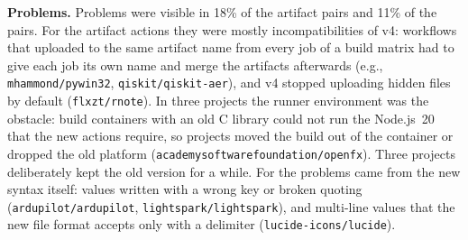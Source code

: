 \textbf{Problems.}
Problems were visible in 18\% of the artifact pairs and 11\% of the \so{} pairs.
For the artifact actions they were mostly incompatibilities of v4: workflows that uploaded to the same artifact name from every job of a build matrix had to give each job its own name and merge the artifacts afterwards (e.g., \texttt{mhammond/pywin32}, \texttt{qiskit/qiskit-aer}), and v4 stopped uploading hidden files by default (\texttt{flxzt/rnote}).
In three projects the runner environment was the obstacle: build containers with an old C library could not run the Node.js~20 that the new actions require, so projects moved the build out of the container or dropped the old platform (\texttt{academysoftwarefoundation/openfx}).
Three projects deliberately kept the old version for a while.
For \so{} the problems came from the new syntax itself: values written with a wrong key or broken quoting (\texttt{ardupilot/ardupilot}, \texttt{lightspark/lightspark}), and multi-line values that the new file format accepts only with a delimiter (\texttt{lucide-icons/lucide}).


